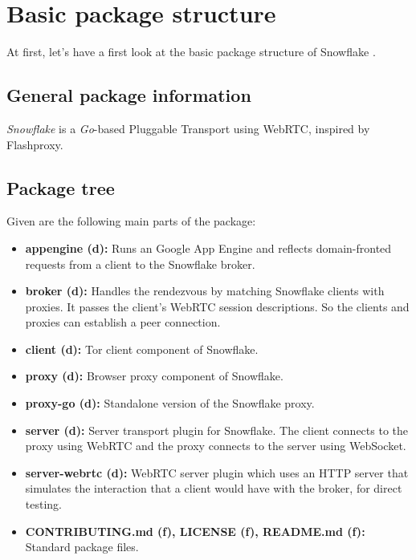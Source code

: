 \documentclass{amsart}
\theoremstyle{definition}
\theoremstyle{remark}
\numberwithin{equation}{section}
\begin{document}
\section{Basic package structure}
\label{s:basicpackagestructure}
At first, let's have a first look at the basic package structure of Snowflake \cite{SnowflakeGit}.
\subsection{General package information}
\label{ss:generalpackageinformation}
\textit{Snowflake} is a \textit{Go}-based Pluggable Transport using WebRTC, inspired by Flashproxy.
\subsection{Package tree}
\label{ss:packagetree}
Given are the following main parts of the package:
\begin{itemize}
    \item \textbf{appengine (d):} Runs an Google App Engine and reflects domain-fronted requests from a client to the Snowflake broker.
    \item \textbf{broker (d):} Handles the rendezvous by matching Snowflake clients with proxies. It passes the client's WebRTC session descriptions. So the clients and proxies can establish a peer connection.
    \item \textbf{client (d):} Tor client component of Snowflake.
    \item \textbf{proxy (d):} Browser proxy component of Snowflake.
    \item \textbf{proxy-go (d):} Standalone version of the Snowflake proxy.
    \item \textbf{server (d):} Server transport plugin for Snowflake. The client connects to the proxy using WebRTC and the proxy connects to the server using WebSocket.
    \item \textbf{server-webrtc (d):} WebRTC server plugin which uses an HTTP server that simulates the interaction that a client would have with the broker, for direct testing.
    \item \textbf{CONTRIBUTING.md (f), LICENSE (f), README.md (f):} Standard package files.
\end{itemize}
\end{document}
